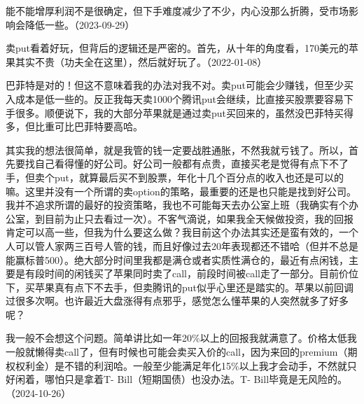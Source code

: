 
能不能增厚利润不是很确定，但下手难度减少了不少，内心没那么折腾，受市场影响会降低一些。（2023-09-29）

卖put看着好玩，但背后的逻辑还是严密的。首先，从十年的角度看，170美元的苹果其实不贵（功夫全在这里），然后就好玩了。（2022-01-08）


巴菲特是对的！但这不意味着我的办法对我不对。卖put可能会少赚钱，但至少买入成本是低一些的。反正我每天卖1000个腾讯put会继续，比直接买股票要容易下手很多。顺便说下，我的大部分苹果就是通过卖put买回来的，虽然没巴菲特买得多，但比重可比巴菲特要高哈。

其实我的想法很简单，就是我管的钱一定要战胜通胀，不然我就亏钱了。所以，首先要找自己看得懂的好公司。好公司一般都有点贵，直接买老是觉得有点下不了手，但卖个put，就算最后买不到股票，年化十几个百分点的收入也还是可以的嘛。这里并没有一个所谓的卖option的策略，最重要的还是也只能是找到好公司。我并不追求所谓的最好的投资策略，我也不可能每天去办公室上班（我确实有个办公室，到目前为止只去看过一次）。不客气滴说，如果我全天候做投资，我的回报肯定可以高一些，但我为什么要这么做？我目前这个办法其实还是蛮有效的，一个人可以管人家两三百号人管的钱，而且好像过去20年表现都还不错哈（但并不总是能赢标普500）。绝大部分时间里我都是满仓或者实质性满仓的，最近有点闲钱，主要是有段时间的闲钱买了苹果同时卖了call，前段时间被call走了一部分。目前价位下，买苹果真有点下不去手，但卖腾讯的put似乎心里还是踏实的。苹果以前回调过很多次啊。也许最近大盘涨得有点邪乎，感觉怎么懂苹果的人突然就多了好多呢？


我一般不会想这个问题。简单讲比如一年20\%以上的回报我就满意了。价格太低我一般就懒得卖call了，但有时候也可能会卖买入价的call，因为来回的premium（期权权利金）是不错的利润哈。一般至少能满足年化15\%以上我才会动手，不然就只好闲着，哪怕只是拿着T- Bill（短期国债）也没办法。T- Bill毕竟是无风险的。（2024-10-26）
